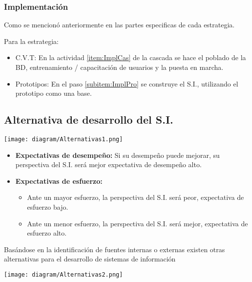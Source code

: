 \documentclass{templateNote}
\begin{document}
\subsubsection{Implementaci\'on}
Como se mencion\'o anteriormente en las partes especificas de cada estrategia.

Para la estrategia:
\begin{itemize}
    \item C.V.T: En la actividad \ref{item:ImplCas} de la cascada se hace el poblado de la BD, entrenamiento / capacitaci\'on de usuarios y la puesta en marcha.
    \item Prototipos: En el paso \ref{subitem:ImplPro} se construye el S.I., utilizando el prototipo como una base.
\end{itemize}

\newpage
\subsection{Alternativa de desarrollo del S.I.}
\begin{center}
    \texttt{[image: diagram/Alternativas1.png]}
\end{center}
\begin{itemize}
    \item \textbf{Expectativas de desempe\~no:} Si su desempe\~no puede mejorar, su perspectiva del S.I. ser\'a mejor expectativa de desempe\~no alto.
    \item \textbf{Expectativas de esfuerzo:}
    \begin{itemize}
        \item Ante un mayor esfuerzo, la perspectiva del S.I. ser\'a peor, expectativa de esfuerzo bajo.
        \item Ante un menor esfuerzo, la perspectiva del S.I. ser\'a mejor, expectativa de esfuerzo alto.
    \end{itemize} 
\end{itemize}
\noindent Basándose en la identificación de fuentes internas o externas existen otras alternativas para el desarrollo de sistemas de información
\begin{center}
    \texttt{[image: diagram/Alternativas2.png]}
\end{center}
\end{document}
